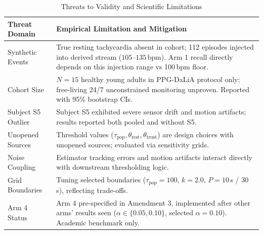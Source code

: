 \begin{table}[htbp]
\caption{Threats to Validity and Scientific Limitations}
\label{tab:limitations}
\centering
\scriptsize
\begin{tabular}{|l|p{4.7cm}|}
\hline
\textbf{Threat Domain} & \textbf{Empirical Limitation and Mitigation} \\
\hline
Synthetic Events & True resting tachycardia absent in cohort; 112 episodes injected into derived stream ($105$--$135$\,bpm). Arm 1 recall directly depends on this injection range vs 100\,bpm floor. \\
\hline
Cohort Size & $N = 15$ healthy young adults in PPG-DaLiA protocol only; free-living 24/7 unconstrained monitoring unproven. Reported with 95\% bootstrap CIs. \\
\hline
Subject S5 Outlier & Subject S5 exhibited severe sensor drift and motion artifacts; results reported both pooled and without S5. \\
\hline
Unopened Sources & Threshold values ($\tau_{\text{pop}}, \theta_{\text{rest}}, \theta_{\text{trust}}$) are design choices with unopened sources; evaluated via sensitivity grids. \\
\hline
Noise Coupling & Estimator tracking errors and motion artifacts interact directly with downstream thresholding logic. \\
\hline
Grid Boundaries & Tuning selected boundaries ($\tau_{\text{pop}} = 100$, $k = 2.0$, $P = 10$\,s / $30$\,s), reflecting trade-offs. \\
\hline
Arm 4 Status & Arm 4 pre-specified in Amendment 3, implemented after other arms' results seen ($\alpha \in \{0.05, 0.10\}$, selected $\alpha = 0.10$). Academic benchmark only. \\
\hline
\end{tabular}
\end{table}

